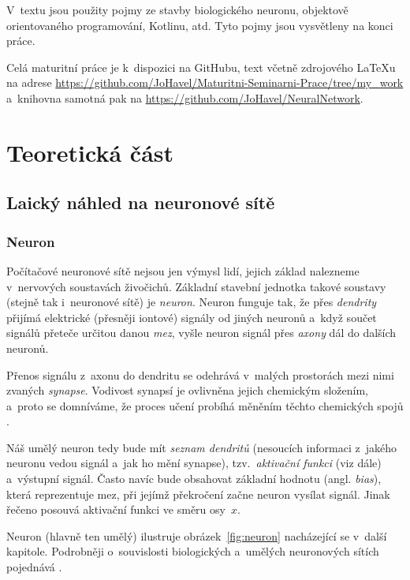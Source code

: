 \documentclass[12pt]{report}			%
\begin{document}
		V~textu jsou použity pojmy ze stavby biologického neuronu, objektově orientovaného programování, \gls{Kotlin}u, atd. Tyto pojmy jsou vysvětleny na konci práce. 
		
		Celá maturitní práce je k~dispozici na GitHubu, text včetně zdrojového LaTeXu na adrese \url{https://github.com/JoHavel/Maturitni-Seminarni-Prace/tree/my\_work} a~knihovna samotná pak na \url{https://github.com/JoHavel/NeuralNetwork}.
	
	
	\part{Teoretická část}
		
			\chapter{Laický náhled na neuronové sítě}
			
				\section{Neuron}
					Počítačové neuronové sítě nejsou jen výmysl lidí, jejich základ nalezneme v~nervových soustavách živočichů. Základní stavební jednotka takové soustavy (stejně tak i~neuronové sítě) je \emph{neuron}. Neuron funguje tak, že přes \emph{\gls{dendrit}y} přijímá elektrické (přesněji iontové) signály od jiných neuronů a~když součet signálů přeteče určitou danou \emph{mez}, vyšle neuron signál přes \emph{\gls{axon}y} dál do dalších neuronů.
					
					Přenos signálu z~\gls{axon}u do \gls{dendrit}u se odehrává v~malých prostorách mezi nimi zvaných \emph{\gls{synapse}}. Vodivost synapsí je ovlivněna jejich chemickým složením, a~proto se domníváme, že proces učení probíhá měněním těchto chemických spojů \autocite[s. 491]{book:Informatika}.
					
					Náš umělý neuron tedy bude mít \emph{seznam \gls{dendrit}ů} (nesoucích informaci z~jakého neuronu vedou signál a~jak ho mění \gls{synapse}), tzv.~\emph{aktivační funkci} (viz dále) a~výstupní signál. Často navíc bude obsahovat základní hodnotu (angl. \emph{bias}), která reprezentuje mez, při jejímž překročení začne neuron vysílat signál. Jinak řečeno posouvá aktivační funkci ve směru osy~$x$.
					
					Neuron (hlavně ten umělý) ilustruje obrázek~\ref{fig:neuron} nacházející se v~další kapitole. Podrobněji o~souvislosti biologických a~umělých neuronových sítích pojednává \autocite{book:BNN}.
				
\end{document}
